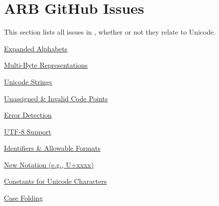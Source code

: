 \documentclass[b4paper]{article}
\begin{document}
\section{ARB GitHub Issues}
\label{ARBiss}

This section lists all issues in \cite{ARB:Issues}, whether or not they relate to Unicode.

\begin{issue}[label=I.\arabic*,ref=\fbox{I.\arabic*}]
\item{\href{https://github.com/users/RexxLA/projects/2/views/6?pane=issue&itemId=35730857}%
{Expanded Alphabets}}
\label{issue:EA}

\item{\href{https://github.com/users/RexxLA/projects/2/views/6?pane=issue&itemId=35730866}%
{Multi-Byte Representations}}
\label{issue:MB}

\item{\href{https://github.com/users/RexxLA/projects/2/views/6?pane=issue&itemId=35730964}%
{Unicode Strings}}
\label{issue:US}

\item{\href{https://github.com/users/RexxLA/projects/2/views/6?pane=issue&itemId=35730903}%
{Unassigned \& Invalid Code Points}}
\label{issue:UICP}

\item{\href{https://github.com/users/RexxLA/projects/2/views/6?pane=issue&itemId=35730928}%
{Error Detection}}
\label{issue:ED}

\item{\href{https://github.com/users/RexxLA/projects/2/views/6?pane=issue&itemId=35730846}%
{UTF-8 Support}}
\label{issue:UTF-8}

\item{\href{https://github.com/users/RexxLA/projects/2/views/6?pane=issue&itemId=35730880}%
{Identifiers \& Allowable Formats}}
\label{issue:IAF}

\item{\href{https://github.com/users/RexxLA/projects/2/views/6?pane=issue&itemId=35730910}%
{New Notation (e.g., U+xxxx)}}
\label{issue:NN}

\item{\href{https://github.com/users/RexxLA/projects/2/views/6?pane=issue&itemId=35730970}%
{Constants for Unicode Characters}}
\label{issue:CUC}

\item{\href{https://github.com/users/RexxLA/projects/2/views/6?pane=issue&itemId=35730937}%
{Case Folding}}
\label{issue:CF}


\end{issue}
\end{document}
